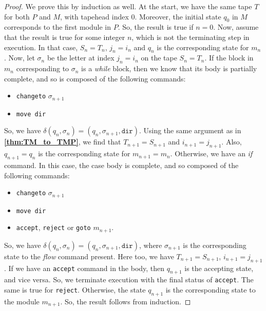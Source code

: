\documentclass{amsart}
\theoremstyle{definition}
\begin{document}
    \begin{proof}
        We prove this by induction as well. At the start, we have the same tape $T$ for both $P$ and $M$, with tapehead index $0$. Moreover, the initial state $q_0$ in $M$ corresponds to the first module in $P$. So, the result is true if $n = 0$. Now, assume that the result is true for some integer $n$, which is not the terminating step in execution. In that case, $S_n = T_n$, $j_n = i_n$ and $q_n$ is the corresponding state for $m_n$. Now, let $\sigma_n$ be the letter at index $j_n = i_n$ on the tape $S_n = T_n$. If the block in $m_n$ corresponding to $\sigma_n$ is a \textit{while} block, then we know that its body is partially complete, and so is composed of the following commands:
        \begin{itemize}
            \item \texttt{changeto} $\sigma_{n+1}$
            \item \texttt{move dir}
        \end{itemize}
        So, we have $\delta(q_n, \sigma_n) = (q_n, \sigma_{n+1}, \texttt{dir})$. Using the same argument as in \textbf{\ref{thm:TM_to_TMP}}, we find that $T_{n+1} = S_{n+1}$ and $i_{n+1} = j_{n+1}$. Also, $q_{n+1} = q_n$ is the corresponding state for $m_{n+1} = m_n$. Otherwise, we have an \textit{if} command. In this case, the case body is complete, and so composed of the following commands:
        \begin{itemize}
            \item \texttt{changeto} $\sigma_{n+1}$
            \item \texttt{move dir}
            \item \texttt{accept}, \texttt{reject} or \texttt{goto} $m_{n+1}$.
        \end{itemize}
        So, we have $\delta(q_n, \sigma_n) = (q_n, \sigma_{n+1}, \texttt{dir})$, where $\sigma_{n+1}$ is the corresponding state to the \textit{flow} command present. Here too, we have $T_{n+1} = S_{n+1}$, $i_{n+1} = j_{n+1}$. If we have an \texttt{accept} command in the body, then $q_{n+1}$ is the accepting state, and vice versa. So, we terminate execution with the final status of \texttt{accept}. The same is true for \texttt{reject}. Otherwise, the state $q_{n+1}$ is the corresponding state to the module $m_{n+1}$. So, the result follows from induction.
    \end{proof}
\end{document}
